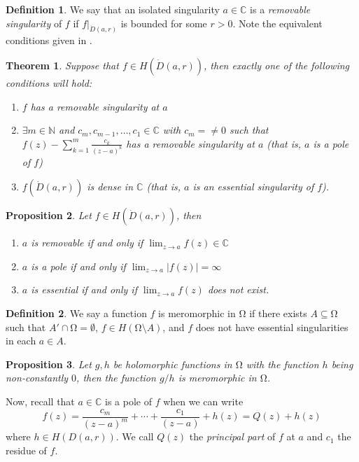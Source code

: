 \documentclass[letterpaper,12pt]{article}
\theoremstyle{definition}
\newtheorem{definition}{Definition}[section]
\theoremstyle{plain}
\newtheorem{thm}{Theorem}[section]
\newtheorem{proposition}[thm]{Proposition}
\theoremstyle{remark}
\newcommand{\N}{\mathbb{N}}
\newcommand{\C}{\mathbb{C}}
\let\oldOmega\Omega
\renewcommand{\Omega}{\mathrm{\oldOmega}}
\begin{document}
\begin{definition}
We say that an isolated singularity $a\in\C$ is a \emph{removable singularity} of $f$ if $f\vert_{\dot{D}(a,r)}$ is bounded for some $r>0$. Note the equivalent conditions given in .
\end{definition}

\begin{thm}
Suppose that $f\in H(\dot{D}(a,r))$, then exactly one of the following conditions will hold:
\begin{enumerate}
	\item $f$ has a removable singularity at $a$
	\item $\exists m\in \N$ and $c_m,c_{m-1},\ldots,c_1\in\C$ with $c_m=\ne 0$ such that $f(z) - \sum_{k=1}^m \frac{c_k}{(z-a)^k}$ has a removable singularity at $a$ (that is, $a$ is a pole of $f$)
	\item $f(\dot{D}(a,r))$ is dense in $\C$ (that is, $a$ is an essential singularity of $f$).
\end{enumerate}
\end{thm}

\begin{proposition}
Let $f\in H(\dot{D}(a,r))$, then
\begin{enumerate}
	\item $a$ is removable if and only if $\lim_{z\to a}f(z)\in \C$
	\item $a$ is a pole if and only if $\lim_{z\to a}|f(z)| = \infty$
	\item $a$ is essential if and only if $\lim_{z\to a}f(z)$ does not exist.
\end{enumerate}
\end{proposition}

\begin{definition}
We say a function $f$ is meromorphic in $\Omega$ if there exists $A\subseteq \Omega$ such that $A'\cap \Omega=\emptyset$, $f\in H(\Omega\setminus A)$, and $f$ does not have essential singularities in each $a\in A$.
\end{definition}

\begin{proposition}
Let $g,h$ be holomorphic functions in $\Omega$ with the function $h$ being non-constantly $0$, then the function $g/h$ is meromorphic in $\Omega$.
\end{proposition}

Now, recall that $a\in \C$ is a pole of $f$ when we can write
\[f(z) = \frac{c_m}{(z-a)^m}+ \cdots + \frac{c_1}{(z-a)}+h(z) = Q(z)+h(z)\]
where $h\in H(D(a,r))$. We call $Q(z)$ the \emph{principal part} of $f$ at $a$ and $c_1$
 the residue of $f$.
\end{document}
